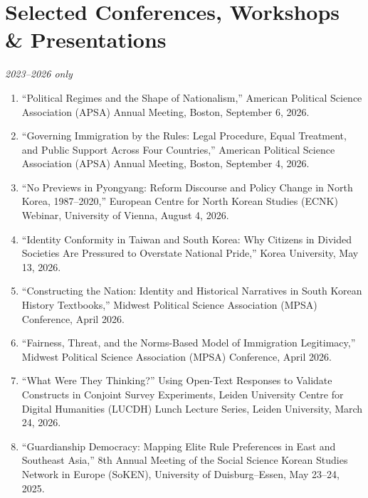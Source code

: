 \documentclass[11pt, a4paper]{article}
\begin{document}
\section{Selected Conferences, Workshops \& Presentations}

{\small\textit{2023--2026 only}}

\begin{enumerate}[itemsep=0.05em]
  \item ``Political Regimes and the Shape of Nationalism,'' American Political Science Association (APSA) Annual Meeting, Boston, September 6, 2026.

  \item ``Governing Immigration by the Rules: Legal Procedure, Equal Treatment, and Public Support Across Four Countries,'' American Political Science Association (APSA) Annual Meeting, Boston, September 4, 2026.

  \item ``No Previews in Pyongyang: Reform Discourse and Policy Change in North Korea, 1987--2020,'' European Centre for North Korean Studies (ECNK) Webinar, University of Vienna, August 4, 2026.

  \item ``Identity Conformity in Taiwan and South Korea: Why Citizens in Divided Societies Are Pressured to Overstate National Pride,'' Korea University, May 13, 2026.

  \item ``Constructing the Nation: Identity and Historical Narratives in South Korean History Textbooks,'' Midwest Political Science Association (MPSA) Conference, April 2026.

  \item ``Fairness, Threat, and the Norms-Based Model of Immigration Legitimacy,'' Midwest Political Science Association (MPSA) Conference, April 2026.

  \item ``What Were They Thinking?'' Using Open-Text Responses to Validate Constructs in Conjoint Survey Experiments, Leiden University Centre for Digital Humanities (LUCDH) Lunch Lecture Series, Leiden University, March 24, 2026.

  \item ``Guardianship Democracy: Mapping Elite Rule Preferences in East and Southeast Asia,'' 8th Annual Meeting of the Social Science Korean Studies Network in Europe (SoKEN), University of Duisburg--Essen, May 23--24, 2025.


\end{enumerate}
\end{document}
